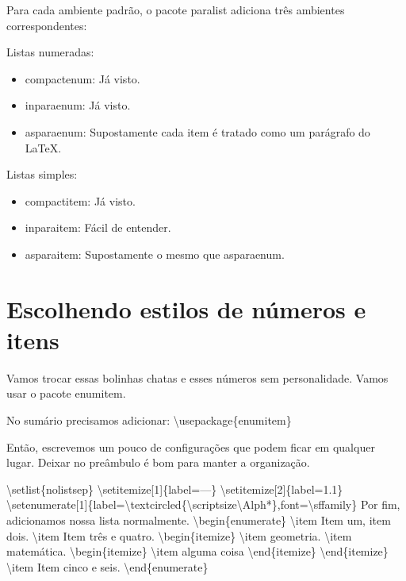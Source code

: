 Para cada ambiente padrão, o pacote paralist adiciona três ambientes correspondentes:

Listas numeradas:
\begin{itemize}
	\item compactenum: Já visto.
	\item inparaenum: Já visto.
	\item asparaenum: Supostamente cada item é tratado como um parágrafo do LaTeX.
\end{itemize}

Listas simples:
\begin{itemize}
	\item compactitem: Já visto.
	\item inparaitem: Fácil de entender.
	\item asparaitem: Supostamente o mesmo que asparaenum.
\end{itemize}

\section{Escolhendo estilos de números e itens}
Vamos trocar essas bolinhas chatas e esses números sem personalidade.
Vamos usar o pacote enumitem.

No sumário precisamos adicionar:
\textbackslash usepackage\{enumitem\}

Então, escrevemos um pouco de configurações que podem ficar em qualquer lugar. Deixar no preâmbulo é bom para manter a organização.

\noindent\textbackslash setlist\{nolistsep\}\newline
\textbackslash setitemize[1]\{label=---\}\newline
\textbackslash setitemize[2]\{label=1.1\}\newline
\textbackslash setenumerate[1]\{label=\textbackslash textcircled\{\textbackslash scriptsize\textbackslash Alph*\},font=\textbackslash sffamily\}\newline
\newline
Por fim, adicionamos nossa lista normalmente.\newline
\textbackslash begin\{enumerate\}\newline
\textbackslash item Item um, item dois.\newline
\textbackslash item Item três e quatro.\newline
\textbackslash begin\{itemize\}\newline
\textbackslash item geometria.\newline
\textbackslash item matemática.\newline
\textbackslash begin\{itemize\}\newline
\textbackslash item alguma coisa\newline
\textbackslash end\{itemize\}\newline
\textbackslash end\{itemize\}\newline
\textbackslash item Item cinco e seis.\newline
\textbackslash end\{enumerate\}\newline


